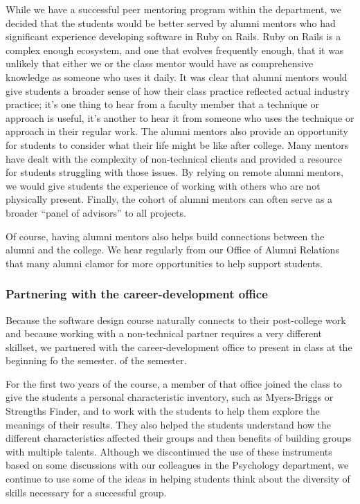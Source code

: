 While we have a successful peer mentoring program within the department,
we decided that the students would be better served by alumni mentors
who had significant experience developing software in Ruby on Rails.
Ruby on Rails is a complex enough ecosystem, and one that evolves
frequently enough, that it was unlikely that either we or the class
mentor would have as comprehensive knowledge as someone who uses
it daily.  It was clear that alumni mentors would give students a
broader sense of how their class practice reflected actual industry
practice; it's one thing to hear from a faculty member that a
technique or approach is useful, it's another to hear it from someone
who uses the technique or approach in their regular work.  The
alumni mentors also provide an opportunity for students to consider
what their life might be like after college.  Many mentors have
dealt with the complexity of non-technical clients and provided a
resource for students struggling with those issues.  By relying on
remote alumni mentors, we would give students the experience of
working with others who are not physically present.  Finally, the
cohort of alumni mentors can often serve as a broader ``panel of
advisors'' to all projects.

Of course, having alumni mentors also helps build connections between
the alumni and the college.  We hear regularly from our Office of
Alumni Relations that many alumni clamor for more opportunities to
help support students.

\subsubsection{Partnering with the career-development office}

Because the software design course naturally connects to their
post-college work and because working with a non-technical partner
requires a very different skillset, we partnered with the 
career-development office to present in class at the beginning
fo the semester.
of the semester. 

For the first two years of the course, a member of that office
joined the class to give the students a personal characteristic
inventory, such as Myers-Briggs or Strengths Finder, and to work
with the students to help them explore the meanings of their results.
They also helped the students understand how the different
characteristics affected their groups and then benefits of building
groups with multiple talents.  Although we discontinued the use of
these instruments based on some discussions with our colleagues in
the Psychology department, we continue to use some of the ideas in
helping students think about the diversity of skills necessary for
a successful group.

